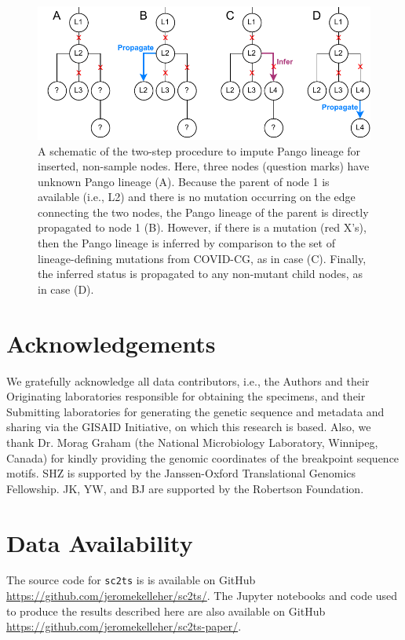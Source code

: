 \documentclass{article}
\begin{document}
\begin{figure} \centering
\includegraphics[width=.7\textwidth]{figures/imputation.pdf}
\caption{\label{fig:imputation}A schematic of the two-step procedure to impute
Pango lineage for inserted, non-sample nodes. Here, three nodes (question
marks) have unknown Pango lineage (A). Because the parent of node 1 is
available (i.e., L2) and there is no mutation occurring on the edge connecting
the two nodes, the Pango lineage of the parent is directly propagated to node 1
(B). However, if there is a mutation (red X’s), then the Pango lineage is
inferred by comparison to the set of lineage-defining mutations from
COVID-CG\citep{Chen2021-zc}, as in case (C). Finally, the inferred status is
propagated to any non-mutant child nodes, as in case (D).
}
\end{figure}

\section{Acknowledgements}
We gratefully acknowledge all data contributors, i.e., the Authors and their
Originating laboratories responsible for obtaining the specimens, and their
Submitting laboratories for generating the genetic sequence and metadata and
sharing via the GISAID Initiative, on which this research is based. Also, we
thank Dr. Morag Graham (the National Microbiology Laboratory, Winnipeg, Canada)
for kindly providing the genomic coordinates of the breakpoint sequence motifs.
SHZ is supported by the Janssen-Oxford Translational Genomics Fellowship. JK,
YW, and BJ are supported by the Robertson Foundation.

\section{Data Availability}
The source code for \texttt{sc2ts} is
is available on GitHub
\url{https://github.com/jeromekelleher/sc2ts/}.
The Jupyter notebooks and code used to produce the results described here are also
available on GitHub \url{https://github.com/jeromekelleher/sc2ts-paper/}.
\end{document}
